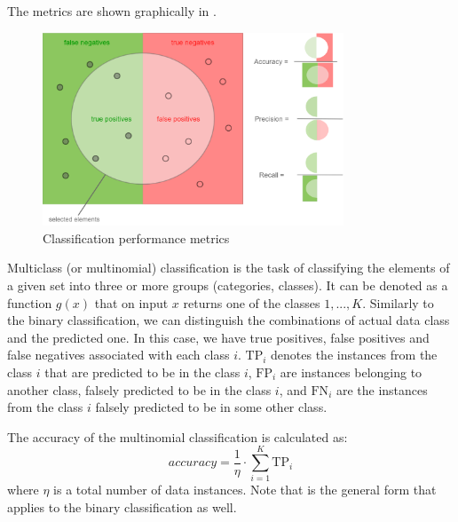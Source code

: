 The metrics are shown graphically in .

\begin{figure}
    \centering
    \includegraphics[width=0.8\textwidth]{Figures/metrics.png}
    \caption{Classification performance metrics}
    \label{fig:performance-metrics}
\end{figure}

Multiclass (or multinomial) classification is the task of classifying the elements of a given set into three or more groups (categories, classes). 
It can be denoted as a function $g(x)$ that on input $x$ returns one of the classes ${1,...,K}$.
Similarly to the binary classification, we can distinguish the combinations of actual data class and the predicted one. In this case, we have true positives, false positives and false negatives associated with each class $i$.
$\text{TP}_i$ denotes the instances from the class $i$ that are predicted to be in the class $i$, $\text{FP}_i$ are instances belonging to another class, falsely predicted to be in the class $i$, and $\text{FN}_i$ are the instances from the class $i$ falsely predicted to be in some other class. 

The accuracy of the multinomial classification is calculated as:
\begin{equation}\label{eq:accuracy-multiclass}
    accuracy = \frac{1}{\eta}\cdot \sum_{i=1}^{K}\text{TP}_i
\end{equation}
where $\eta$ is a total number of data instances. Note that  is the general form that applies to the binary classification as well. 

